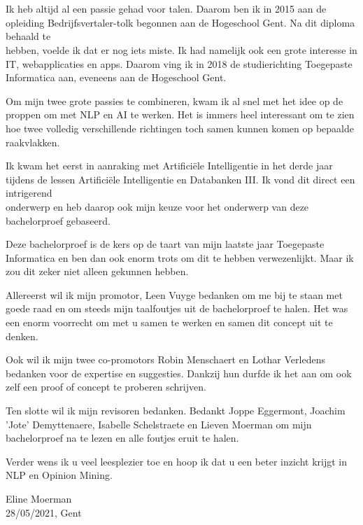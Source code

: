 
\chapter*{}
\label{ch:voorwoord}

Ik heb altijd al een passie gehad voor talen. Daarom ben ik in 2015 aan de opleiding Bedrijfsvertaler-tolk begonnen aan de Hogeschool Gent. Na dit diploma behaald te \\hebben, voelde ik dat er nog iets miste. Ik had namelijk ook een grote interesse in IT, webapplicaties en apps. Daarom ving ik in 2018 de studierichting Toegepaste Informatica aan, eveneens aan de Hogeschool Gent.

Om mijn twee grote passies te combineren, kwam ik al snel met het idee op de proppen om met NLP en AI te werken. Het is immers heel interessant om te zien hoe twee volledig verschillende richtingen toch samen kunnen komen op bepaalde raakvlakken.

Ik kwam het eerst in aanraking met Artificiële Intelligentie in het derde jaar tijdens de lessen Artificiële Intelligentie en Databanken III. Ik vond dit direct een intrigerend \\onderwerp en heb daarop ook mijn keuze voor het onderwerp van deze bachelorproef gebaseerd. 

Deze bachelorproef is de kers op de taart van mijn laatste jaar Toegepaste Informatica en ben dan ook enorm trots om dit te hebben verwezenlijkt. Maar ik zou dit zeker niet alleen gekunnen hebben.

Allereerst wil ik mijn promotor, Leen Vuyge bedanken om me bij te staan met goede raad en om steeds mijn taalfoutjes uit de bachelorproef te halen. Het was een enorm voorrecht om met u samen te werken en samen dit concept uit te denken.

Ook wil ik mijn twee co-promotors Robin Menschaert en Lothar Verledens bedanken voor de expertise en suggesties. Dankzij hun durfde ik het aan om ook zelf een proof of concept te proberen schrijven.

Ten slotte wil ik mijn revisoren bedanken. Bedankt Joppe Eggermont, Joachim 'Jote' Demyttenaere, Isabelle Schelstraete en Lieven Moerman om mijn bachelorproef na te lezen en alle foutjes eruit te halen.

Verder wens ik u veel leesplezier toe en hoop ik dat u een beter inzicht krijgt in NLP en Opinion Mining.

Eline Moerman \\
28/05/2021, Gent
